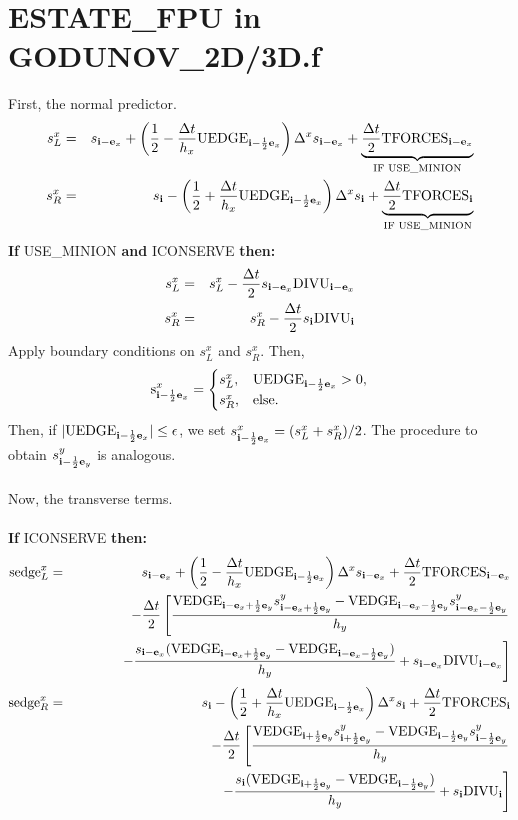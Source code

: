 \section{ESTATE\_FPU in GODUNOV\_2D/3D.f}
First, the normal predictor.
\begin{eqnarray}
s_L^x &=& s_{{\bf i}-{\bf e}_x} + \left(\frac{1}{2} - \frac{\Delta t}{h_x}\text{UEDGE}_{{\bf i}-\frac{1}{2}{\bf e}_x}\right)\Delta^x s_{{\bf i}-{\bf e}_x} + \underbrace{\frac{\Delta t}{2}\text{TFORCES}_{{\bf i}-{\bf e}_x}}_{\text{IF USE\_MINION}} \\
s_R^x &=& s_{{\bf i}} - \left(\frac{1}{2} + \frac{\Delta t}{h_x}\text{UEDGE}_{{\bf i}-\frac{1}{2}{\bf e}_x}\right)\Delta^x s_{{\bf i}} + \underbrace{\frac{\Delta t}{2}\text{TFORCES}_{{\bf i}}}_{\text{IF USE\_MINION}}
\end{eqnarray}
{\bf If} USE\_MINION {\bf and} ICONSERVE {\bf then:}
\begin{eqnarray}
s_L^x &=& s_L^x - \frac{\Delta t}{2}s_{{\bf i}-{\bf e}_x}\text{DIVU}_{{\bf i}-{\bf e}_x} \\
s_R^x &=& s_R^x - \frac{\Delta t}{2}s_{{\bf i}}\text{DIVU}_{{\bf i}}
\end{eqnarray}
Apply boundary conditions on $s_L^x$ and $s_R^x$.  Then,
\begin{equation}
\text{s}_{{\bf i}-\frac{1}{2}{\bf e}_x}^x =
\begin{cases}
s_L^x, & \text{UEDGE}_{{\bf i}-\frac{1}{2}{\bf e}_x} > 0, \\
s_R^x, & \text{else}. \\
\end{cases}\label{ESTATE_FPU Upwind}
\end{equation}
Then, if $|\text{UEDGE}_{{\bf i}-\frac{1}{2}{\bf e}_x}| \le \epsilon$, we set $s_{{\bf i}-\frac{1}{2}{\bf e}_x}^x = (s_L^x+s_R^x)/2$.  The procedure to obtain $s_{{\bf i}-\frac{1}{2}{\bf e}_y}^y$ is analogous.\\ \\
Now, the transverse terms.\\ \\
{\bf If} ICONSERVE {\bf then:}
\begin{eqnarray}
\text{sedge}_L^x &=& s_{{\bf i}-{\bf e}_x} + \left(\frac{1}{2} - \frac{\Delta t}{h_x}\text{UEDGE}_{{\bf i}-\frac{1}{2}{\bf e}_x}\right)\Delta^x s_{{\bf i}-{\bf e}_x} + \frac{\Delta t}{2}\text{TFORCES}_{{\bf i}-{\bf e}_x} \nonumber\\
&& - \frac{\Delta t}{2}\left[\frac{\text{VEDGE}_{{\bf i}-{\bf e}_x+\frac{1}{2}{\bf e}_y}s_{{\bf i}-{\bf e}_x+\frac{1}{2}{\bf e}_y}^y - \text{VEDGE}_{{\bf i}-{\bf e}_x-\frac{1}{2}{\bf e}_y}s_{{\bf i}-{\bf e}_x-\frac{1}{2}{\bf e}_y}^y}{h_y}\right.\nonumber\\
&& ~~~~~~~~~~ \left. - \frac{s_{{\bf i}-{\bf e}_x}(\text{VEDGE}_{{\bf i}-{\bf e}_x+\frac{1}{2}{\bf e}_y}-\text{VEDGE}_{{\bf i}-{\bf e}_x-\frac{1}{2}{\bf e}_y})}{h_y}+s_{{\bf i}-{\bf e}_x}\text{DIVU}_{{\bf i}-{\bf e}_x}\right]\\
\text{sedge}_R^x &=& s_{{\bf i}} - \left(\frac{1}{2} + \frac{\Delta t}{h_x}\text{UEDGE}_{{\bf i}-\frac{1}{2}{\bf e}_x}\right)\Delta^x s_{{\bf i}} + \frac{\Delta t}{2}\text{TFORCES}_{{\bf i}} \nonumber\\
&& - \frac{\Delta t}{2}\left[\frac{\text{VEDGE}_{{\bf i}+\frac{1}{2}{\bf e}_y}s_{{\bf i}+\frac{1}{2}{\bf e}_y}^y - \text{VEDGE}_{{\bf i}-\frac{1}{2}{\bf e}_y}s_{{\bf i}-\frac{1}{2}{\bf e}_y}^y}{h_y}\right.\nonumber\\
&& ~~~~~~~~~~ \left. - \frac{s_{{\bf i}}(\text{VEDGE}_{{\bf i}+\frac{1}{2}{\bf e}_y}-\text{VEDGE}_{{\bf i}-\frac{1}{2}{\bf e}_y})}{h_y}+s_{{\bf i}}\text{DIVU}_{{\bf i}}\right]
\end{eqnarray}
